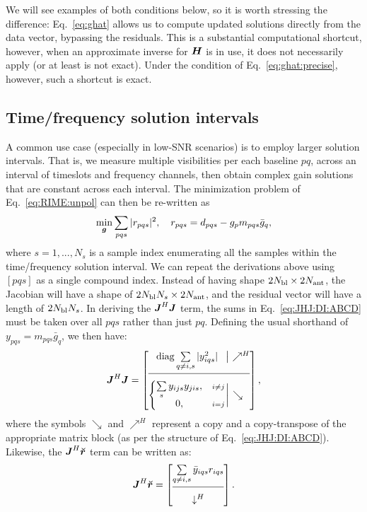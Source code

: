 \documentclass[useAMS,usenatbib]{mn2e}
\makeatletter
\newcommand{\mat}[1]{{\bmath{#1}}}
\newcommand{\JJ}{\mat{J}} %
\newcommand{\HH}{\mat{H}} %
\newcommand{\JHJ}{\JJ^H\JJ} %
\newcommand{\Matrix}[2]{\left [ \begin{array}{@{}#1@{}}#2\end{array} \right ]}
\newcommand{\AUG}[1]{\bmath{\breve{#1}}}
\newcommand{\Rr}{\AUG{r}}
\numberwithin{equation}{section}
\makeatother
\begin{document}
We will see examples of both conditions below, so it is worth stressing the difference: Eq.~\ref{eq:ghat}
allows us to compute updated solutions directly from the data vector, bypassing the residuals. This is a 
substantial computational shortcut, however, when an approximate inverse for $\HH$ is in use, it 
does not necessarily apply (or at least is not exact). Under the condition of Eq.~\ref{eq:ghat:precise}, however, 
such a shortcut is exact.


\subsection{Time/frequency solution intervals}
\label{sec:unpol:DI:avg}
\label{sec:solution-intervals}

\newcommand{\Ns}{N_s}

A common use case (especially in low-SNR scenarios) is to employ larger solution intervals. 
That is, we measure multiple visibilities per each baseline $pq$, across an interval of timeslots and
frequency channels, then obtain complex gain solutions that are constant across each interval. The 
minimization problem of Eq.~\ref{eq:RIME:unpol} can then be re-written as
\begin{equation}
\label{eq:cal:DI:tf}
\min_{\bmath{g}}\sum_{pqs}|r_{pqs}|^2, 
~~~r_{pqs} = d_{pqs}-g_p m_{pqs} \bar{g}_q, 
\end{equation}
where $s=1,...,N_s$ is a sample index enumerating all the samples within the 
time/frequency solution interval. We can repeat the derivations above using  $[pqs]$ as a
single compound index. Instead of having shape $2N_\mathrm{bl}\times2N_\mathrm{ant}$, the Jacobian 
will have a shape of $2\Nbl\Ns\times 2\Na$, and the residual vector will have a length of 
$2\Nbl\Ns$. In deriving the $\JHJ$ term, the sums in Eq.~\ref{eq:JHJ:DI:ABCD} must be taken over all $pqs$ 
rather than just $pq$. Defining the usual shorthand of 
$y_{pqs}=m_{pqs}\bar{g}_q$, we then have:
\begin{equation}
\label{eq:JHJ:DI:tf}
\JJ^H \JJ = 
\JHJblocks{
  \mathrm{diag} \sum\limits_{q\ne i,s} |y^2_{iqs}| 
}{
  \left \{ 
  \begin{array}{@{}cc@{}}
   \sum\limits_{s} y_{ijs}y_{jis},&{\scriptstyle i\ne j} \\
   0, &{\scriptstyle i=j}
  \end{array} \right . 
},
\end{equation}
where the symbols $\searrow$ and $\nearrow^H$ represent a copy and a copy-transpose of the appropriate matrix 
block (as per the structure of Eq.~\ref{eq:JHJ:DI:ABCD}). Likewise, the $\JJ^H\Rr$ term can be written as:
\begin{equation}
\label{eq:JHR:DI:tf}
\JJ^H\Rr 
= \Matrix{c}{
\sum\limits_{q\ne i,s} \bar{y}_{iqs} r_{iqs}   \\
 \hline \\[-8pt]
\downarrow^H
}.
\end{equation}
\end{document}
